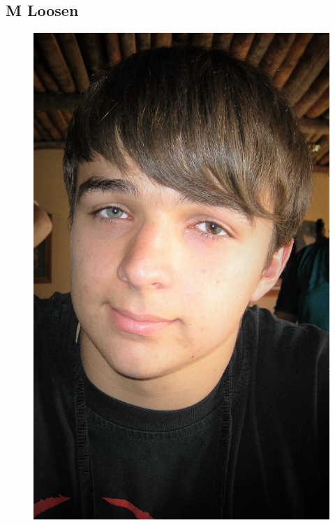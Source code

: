 \documentclass{article}
\begin{document}
	\subsection{M Loosen}
	\begin{figure}[h]
		\centering
		\includegraphics[height=0.3\textheight]{../Michael.jpg}
	\end{figure}
\end{document}
